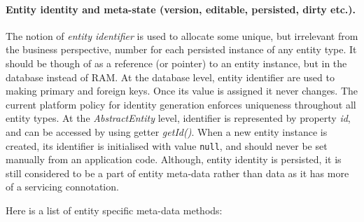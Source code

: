   \paragraph*{Entity identity and meta-state (version, editable, persisted, dirty etc.).}

  The notion of \emph{entity identifier} is used to allocate some unique, but irrelevant from the business perspective, number for each persisted instance of any entity type.
  It should be though of as a reference (or pointer) to an entity instance, but in the database instead of RAM.
  At the database level, entity identifier are used to making primary and foreign keys.
  Once its value is assigned it never changes.
  The current platform policy for identity generation enforces uniqueness throughout all entity types.
  At the \emph{AbstractEntity} level, identifier is represented by property \emph{id}, and can be accessed by using getter \emph{getId()}.
  When a new entity instance is created, its identifier is initialised with value \texttt{null}, and should never be set manually from an application code.
  Although, entity identity is persisted, it is still considered to be a part of entity meta-data rather than data as it has more of a servicing connotation.

  Here is a list of entity specific meta-data methods:

